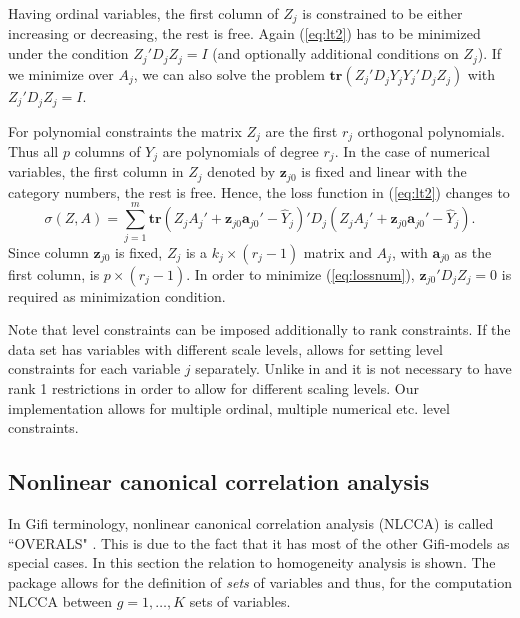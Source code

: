 \documentclass[article]{jss1}
\begin{document}
Having ordinal variables, the first column of $Z_j$ is constrained to be either increasing or decreasing, the rest is free. Again (\ref{eq:lt2}) has to be minimized under the condition $Z_j'D_j^{}Z_j^{}=I$ (and optionally additional conditions on $Z_j$). If we minimize over $A_j$, we can also solve the problem $\mathbf{tr}(Z_j'D_j^{}Y_j^{}Y_j'D_j^{}Z_j^{})$ with $Z_j'D_j^{}Z_j^{}=I$.

For polynomial constraints the matrix $Z_j$ are the first \(r_j\) orthogonal polynomials. Thus all \(p\) columns of \(Y_j\) are polynomials of degree \(r_j\).  In the case of numerical variables, the first column in $Z_j$ denoted by $\mathbf{z}_{j0}$ is fixed and linear with the category numbers, the rest is free. 
Hence, the loss function in (\ref{eq:lt2}) changes to 
\begin{equation}
\label{eq:lossnum}
\sigma(Z,A)=\sum_{j=1}^m \mathbf{tr}(Z_jA_j'+\mathbf{z}_{j0}\mathbf{a}_{j0}'- \hat Y_j)'D_j(Z_jA_j'+\mathbf{z}_{j0}\mathbf{a}_{j0}'-\hat Y_j).
\end{equation}
Since column $\mathbf{z}_{j0}$ is fixed, $Z_j$ is a $k_j \times (r_j-1)$ matrix and $A_j$, with $\mathbf{a}_{j0}$ as the first column, is $p \times (r_j-1)$. In order to minimize (\ref{eq:lossnum}), $\mathbf{z}_{j0}'D_jZ_j=0$ is required as minimization condition.

Note that level constraints can be imposed additionally to rank constraints. If the data set has variables with different scale levels,  allows for setting level constraints for each variable $j$ separately. Unlike in \citet{Gifi:90} and \citet{Michailidis+deLeeuw:98} it is not necessary to have rank 1 restrictions in order to allow for different scaling levels. Our implementation allows for multiple ordinal, multiple numerical etc. level constraints. 

\subsection{Nonlinear canonical correlation analysis}
In Gifi terminology, nonlinear canonical correlation analysis (NLCCA) is called ``OVERALS" \citep{vanderBurg+deLeeuw+Verdegaal:88, vanderBurg+deLeeuw+Dijksterhuis:94}. This is due to the fact that it has most of the other Gifi-models as special cases. 
In this section the relation to homogeneity analysis is shown. The  package allows for the definition of \emph{sets} of variables and thus, for the computation NLCCA between $g = 1,\ldots,K$ sets of variables. 
\end{document}
